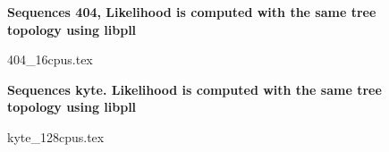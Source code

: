 \documentclass[12pt,a4paper]{article}
\begin{document}
\newcommand*{\figuretitle}[1]{%
    {\centering%
    \textbf{#1}%
    \par\medskip}%
}



\begin{figure}
\figuretitle{Sequences 404, Likelihood is computed with the same tree topology using libpll}
{404_16cpus.tex}
\end{figure}


%

\begin{figure}
\figuretitle{Sequences kyte. Likelihood is computed with the same tree topology using libpll}
{kyte_128cpus.tex}
\end{figure}
\end{document}
